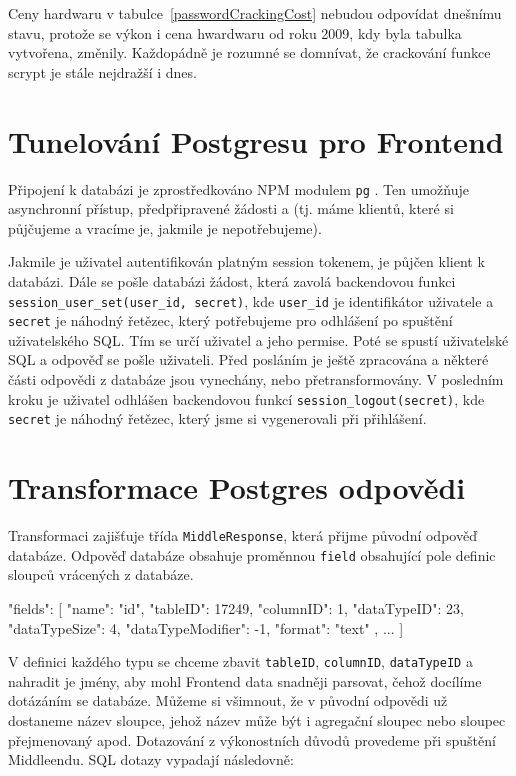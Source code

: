 Ceny hardwaru v tabulce~\ref{passwordCrackingCost} nebudou odpovídat dnešnímu stavu,
protože se výkon i cena hwardwaru od roku 2009, kdy byla tabulka vytvořena, změnily.
Každopádně je rozumné se domnívat, že crackování funkce scrypt je stále
nejdražší i dnes.

\section{Tunelování Postgresu pro Frontend}

Připojení k databázi je zprostředkováno NPM modulem \verb|pg| \citep[viz][]{NodePg}.
Ten umožňuje asynchronní přístup, předpřipravené žádosti a 
(tj. máme  klientů, které si půjčujeme a vracíme je, jakmile je nepotřebujeme).

Jakmile je uživatel autentifikován platným session tokenem, je půjčen klient k databázi.
Dále se pošle databázi žádost, která zavolá backendovou funkci
\verb|session_user_set(user_id, secret)|, kde
\verb|user_id| je identifikátor uživatele a \verb|secret| je náhodný řetězec, který
potřebujeme pro odhlášení po spuštění uživatelského SQL.
Tím se určí uživatel a jeho permise.
Poté se spustí uživatelské SQL a odpověď se pošle uživateli.
Před posláním je ještě zpracována a některé části odpovědi z databáze jsou
vynechány, nebo přetransformovány.
V posledním kroku je uživatel odhlášen backendovou funkcí \verb|session_logout(secret)|,
kde \verb|secret| je náhodný řetězec, který jsme si vygenerovali při přihlášení.

\section{Transformace Postgres odpovědi}

Transformaci zajišťuje třída \verb|MiddleResponse|, která přijme původní odpověď databáze.
Odpověď databáze obsahuje proměnnou \verb|field| obsahující pole definic sloupců vrácených
z databáze.

\begin{code}
"fields": [
    {
        "name": "id",
        "tableID": 17249,
        "columnID": 1,
        "dataTypeID": 23,
        "dataTypeSize": 4,
        "dataTypeModifier": -1,
        "format": "text"
    },
    ...
]
\end{code}

V definici každého typu se chceme zbavit \verb|tableID|, \verb|columnID|, \verb|dataTypeID| a
nahradit je jmény, aby mohl Frontend data snadněji parsovat, čehož docílíme dotázáním se databáze.
Můžeme si všimnout, že v původní odpovědi už dostaneme název sloupce, jehož název může být
i agregační sloupec nebo sloupec přejmenovaný apod.
Dotazování z výkonostních důvodů provedeme při spuštění Middleendu.
SQL dotazy vypadají následovně:

